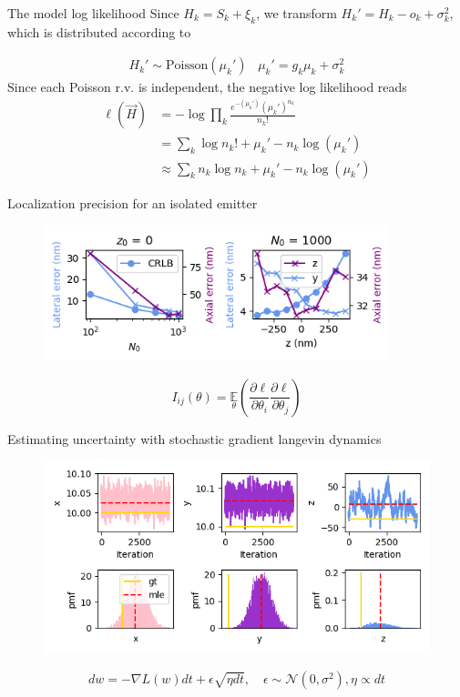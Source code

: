 \documentclass{beamer}					%
\begin{document}
\begin{frame}{The model log likelihood}
Since $H_{k} = S_{k} + \xi_{k}$, we transform $H_{k}' = H_{k} - o_{k} + \sigma_{k}^{2}$, which is distributed according to 

\begin{align*}
H_{k}' \sim \mathrm{Poisson}(\mu_{k}')\;\;\;\mu_{k}' = g_{k}\mu_{k} + \sigma_{k}^{2}
\end{align*}
Since each Poisson r.v. is independent, the negative log likelihood reads
\begin{align*}
\ell(\vec{H}) &= -\log \prod_{k} \frac{e^{-\left(\mu_{k}'\right)}\left(\mu_{k}'\right)^{n_{k}}}{n_{k}!}\\
&= \sum_{k}  \log n_{k}! + \mu_{k}' - n_{k}\log\left(\mu_{k}'\right)\\
&\approx \sum_{k}  n_{k}\log n_{k} + \mu_{k}' - n_{k}\log\left(\mu_{k}'\right)
\end{align*}

\end{frame}

\begin{frame}{Localization precision for an isolated emitter}
\begin{figure}
\includegraphics[width=10cm]{Errors.png}
\end{figure}
\begin{equation}
I_{ij}(\theta) = \underset{\theta}{\mathbb{E}}\left(\frac{\partial \ell}{\partial\theta_{i}}\frac{\partial\ell}{\partial\theta_{j}}\right) 
\end{equation}
\end{frame}


\begin{frame}{Estimating uncertainty with stochastic gradient langevin dynamics}
\begin{figure}
\includegraphics[width=13cm]{SGLD.png}
\end{figure}
$$dw = - \nabla L(w) dt + \epsilon \sqrt{\eta dt}, \quad \epsilon \sim \mathcal N(0, \sigma^2), \eta \propto dt$$
\end{frame}
\end{document}
